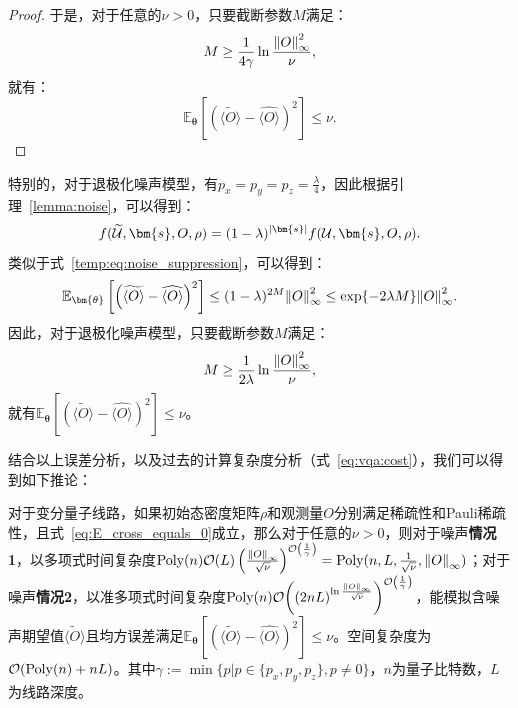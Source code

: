 \begin{proof}
    于是，对于任意的$\nu > 0$，只要截断参数$M$满足：
    \begin{equation}
        M\geq\frac{1}{4\gamma}\ln{\frac{\norm{O}_\infty^2}{\nu}},
    \end{equation}
    就有：
    \begin{equation}
        \mathbb{E}_{\bm{\theta}}\left[\left(\widetilde{\langle O\rangle}-\widehat{\langle O\rangle}\right)^2\right]\leq\nu.
    \end{equation}
\end{proof}
\begin{remark}
    特别的，对于退极化噪声模型，有$p_x=p_y=p_z=\frac{\lambda}{4}$，因此根据引理~\ref{lemma:noise}，可以得到：
    \begin{equation}
        f(\widetilde{\mathcal{U}},\bm{s},O,\rho)=(1-\lambda)^{\abs{\bm{s}}}f(\mathcal{U},\bm{s},O,\rho).
    \end{equation}
    类似于式~\eqref{temp:eq:noise_suppression}，可以得到：
    \begin{equation}
        \mathbb{E}_{\bm{\theta}}\left[\left(\widetilde{\langle O\rangle}-\widehat{\langle O\rangle}\right)^2\right] \leq (1-\lambda)^{2M} \norm{O}_\infty^2 \leq \exp{-2\lambda M} \norm{O}_\infty^2.
    \end{equation}
    因此，对于退极化噪声模型，只要截断参数$M$满足：
    \begin{equation}\label{eq:depolarizing_M:1}
        M\geq\frac{1}{2\lambda}\ln{\frac{\norm{O}_\infty^2}{\nu}},
    \end{equation}
    就有$\mathbb{E}_{\bm{\theta}}\left[\left(\widetilde{\langle O\rangle}-\widehat{\langle O\rangle}\right)^2\right]\leq\nu$。
\end{remark}

结合以上误差分析，以及过去的计算复杂度分析（式~\eqref{eq:vqa:cost}），我们可以得到如下推论：

\begin{corollary}\label{corollary:noise}
    对于变分量子线路，如果初始态密度矩阵$\rho$和观测量$O$分别满足稀疏性和Pauli稀疏性，且式~\eqref{eq:E_cross_equals_0}成立，那么对于任意的$\nu > 0$，则对于噪声\textbf{情况1}，以多项式时间复杂度$\poly(n)\order{L}\left(\frac{\norm{O}_\infty}{\sqrt{\nu}}\right)^{\order{\frac{1}{\gamma}}}=\poly(n,L,\frac{1}{\sqrt{\nu}},\norm{O}_\infty)$；对于噪声\textbf{情况2}，以准多项式时间复杂度$\poly(n)\order{(2nL)^{\ln \frac{\norm{O}_\infty}{\sqrt{\nu}}}}^{\order{\frac{1}{\gamma}}}$，能模拟含噪声期望值$\widetilde{\langle O\rangle}$且均方误差满足$\mathbb{E}_{\bm{\theta}}\left[\left(\widetilde{\langle O\rangle}-\widehat{\langle O\rangle}\right)^2\right]\leq\nu$。空间复杂度为$\order{\mathrm{Poly}(n)+nL}$。其中$\gamma:=\min\{p|{p \in \{p_x,p_y,p_z\},p\neq 0}\}$，$n$为量子比特数，$L$为线路深度。
\end{corollary}

